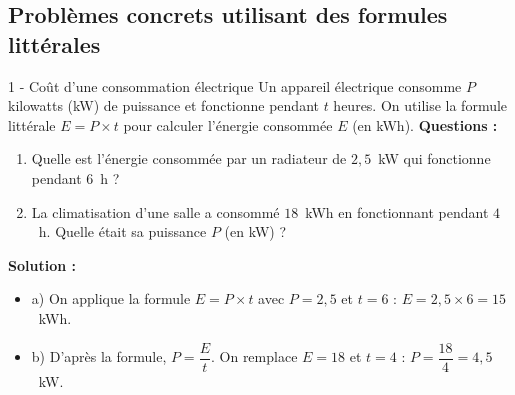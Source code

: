 \subsection{Problèmes concrets utilisant des formules littérales}
\begin{exercice}{1 - Coût d'une consommation électrique} Un appareil électrique consomme $P$ kilowatts (kW) de puissance et fonctionne pendant $t$ heures. On utilise la formule littérale $E = P \times t$ pour calculer l'énergie consommée $E$ (en kWh).
\medskip
\textbf{Questions :} 
\begin{enumerate}[label=\alph*)] 
\item Quelle est l'énergie consommée par un radiateur de $2{,}5$~kW qui fonctionne pendant $6$~h ? 
\item La climatisation d'une salle a consommé $18$~kWh en fonctionnant pendant $4$~h. Quelle était sa puissance $P$ (en kW) ? 
\end{enumerate}

\textbf{Solution :} 
\begin{itemize} 
\item a) On applique la formule $E = P \times t$ avec $P = 2,5$ et $t = 6$ : $E = 2,5 \times 6 = 15$~kWh. 
\item b) D'après la formule, $P = \dfrac{E}{t}$. On remplace $E = 18$ et $t = 4$ : $P = \dfrac{18}{4} = 4,5$~kW. 
\end{itemize} 
\end{exercice}

